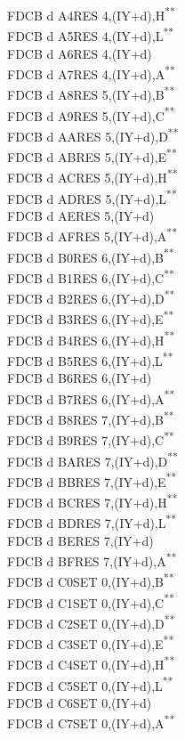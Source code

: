 \documentclass[12pt,twoside,openright,a4paper]{book}
\newcommand{\UNDOC}{\textnormal{\textsuperscript{**}}}
\begin{document}
\begin{multicols}{3}
{\begin{tabbing}
	FDCB d A4\>RES 4,(IY+d),H\UNDOC\\
	FDCB d A5\>RES 4,(IY+d),L\UNDOC\\
	FDCB d A6\>RES 4,(IY+d)\\
	FDCB d A7\>RES 4,(IY+d),A\UNDOC\\
	FDCB d A8\>RES 5,(IY+d),B\UNDOC\\
	FDCB d A9\>RES 5,(IY+d),C\UNDOC\\
	FDCB d AA\>RES 5,(IY+d),D\UNDOC\\
	FDCB d AB\>RES 5,(IY+d),E\UNDOC\\
	FDCB d AC\>RES 5,(IY+d),H\UNDOC\\
	FDCB d AD\>RES 5,(IY+d),L\UNDOC\\
	FDCB d AE\>RES 5,(IY+d)\\
	FDCB d AF\>RES 5,(IY+d),A\UNDOC\\
	FDCB d B0\>RES 6,(IY+d),B\UNDOC\\
	FDCB d B1\>RES 6,(IY+d),C\UNDOC\\
	FDCB d B2\>RES 6,(IY+d),D\UNDOC\\
	FDCB d B3\>RES 6,(IY+d),E\UNDOC\\
	FDCB d B4\>RES 6,(IY+d),H\UNDOC\\
	FDCB d B5\>RES 6,(IY+d),L\UNDOC\\
	FDCB d B6\>RES 6,(IY+d)\\
	FDCB d B7\>RES 6,(IY+d),A\UNDOC\\
	FDCB d B8\>RES 7,(IY+d),B\UNDOC\\
	FDCB d B9\>RES 7,(IY+d),C\UNDOC\\
	FDCB d BA\>RES 7,(IY+d),D\UNDOC\\
	FDCB d BB\>RES 7,(IY+d),E\UNDOC\\
	FDCB d BC\>RES 7,(IY+d),H\UNDOC\\
	FDCB d BD\>RES 7,(IY+d),L\UNDOC\\
	FDCB d BE\>RES 7,(IY+d)\\
	FDCB d BF\>RES 7,(IY+d),A\UNDOC\\
	FDCB d C0\>SET 0,(IY+d),B\UNDOC\\
	FDCB d C1\>SET 0,(IY+d),C\UNDOC\\
	FDCB d C2\>SET 0,(IY+d),D\UNDOC\\
	FDCB d C3\>SET 0,(IY+d),E\UNDOC\\
	FDCB d C4\>SET 0,(IY+d),H\UNDOC\\
	FDCB d C5\>SET 0,(IY+d),L\UNDOC\\
	FDCB d C6\>SET 0,(IY+d)\\
	FDCB d C7\>SET 0,(IY+d),A\UNDOC\\

\end{tabbing}}
\end{multicols}
\end{document}
